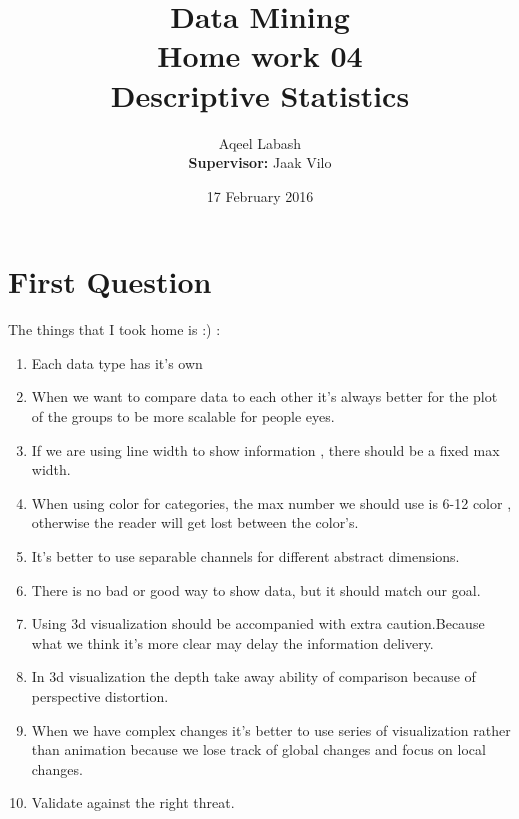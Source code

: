 \documentclass{article}
\title{Data Mining\\
		Home work 04\\Descriptive Statistics}
\author{Aqeel Labash\\ \textbf{Supervisor:} Jaak Vilo}
\date{17 February 2016}
\begin{document}
	\maketitle
	\section*{First Question}
	The things that I took home is :) :
	\begin{enumerate}
\item  Each data type has it's own
\item When we want to compare data to each other it's always better for the plot of the groups to be more scalable for people eyes.
\item If we are using line width to show information , there should be a fixed max width.
\item When using color for categories, the max number we should use is 6-12 color , otherwise the reader will get lost between the color's.
\item It's better to use separable channels for different abstract dimensions.
\item There is no bad or good way to show data, but it should match our goal.
\item Using 3d visualization should be accompanied with extra caution.Because what we think it's more clear may delay the information delivery.
\item In 3d visualization the depth take away ability of comparison because of perspective distortion.
\item When we have complex changes it's better to use series of visualization rather than animation because we lose track of global changes and focus on local changes.
\item Validate against the right threat.
	\end{enumerate}
\end{document}
